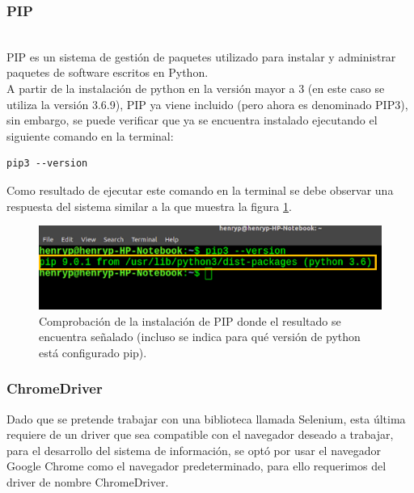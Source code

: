 {{\subsubsection{PIP}\\

\noindent PIP es un sistema de gestión de paquetes utilizado para instalar y administrar paquetes de software escritos en Python.\\

\noindent A partir de la instalación de python en la versión mayor a 3 (en este caso se utiliza la versión 3.6.9), PIP ya viene incluido (pero ahora es denominado PIP3), sin embargo, se puede verificar que ya se encuentra instalado ejecutando el siguiente comando en la terminal:

\begin{lstlisting}
pip3 --version
\end{lstlisting}

\noindent Como resultado de ejecutar este comando en la terminal se debe observar una respuesta del sistema similar a la que muestra la figura \ref{2.3.1}.

\begin{figure}[H]
    \centering
    \includegraphics[scale=0.85]{Capitulo4/Documentos/imagenes_entorno/figura2-3-1.png}
    \caption{Comprobación de la instalación de PIP donde el resultado se encuentra señalado (incluso se indica para qué versión de python está configurado pip).}
    \label{2.3.1}
\end{figure}

\subsubsection{ChromeDriver}

\noindent Dado que se pretende trabajar con una biblioteca llamada Selenium, esta última requiere de un driver que sea compatible con el navegador deseado a trabajar, para el desarrollo del sistema de información, se optó por usar el navegador Google Chrome como el navegador predeterminado, para ello requerimos del driver de nombre ChromeDriver.\\

}}
